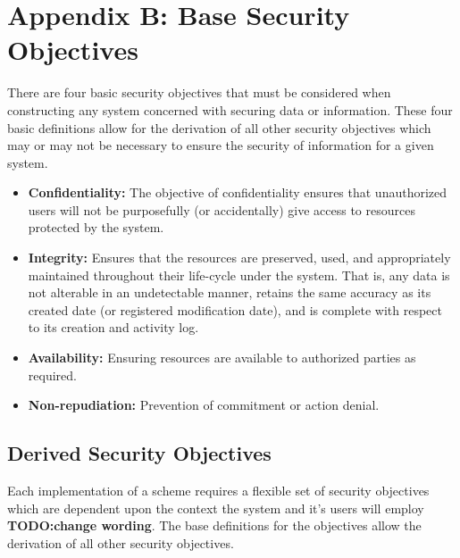 \section{Appendix B: Base Security Objectives}

There are four basic security objectives that must be considered when constructing any system concerned with securing data or information. These four basic definitions allow for the derivation of all other security objectives which may or may not be necessary to ensure the security of information for a given system.

\begin{itemize}
    \item \textbf{Confidentiality:} The objective of confidentiality ensures that unauthorized users will not be purposefully (or accidentally) give access to resources protected by the system. 
    \item \textbf{Integrity:} Ensures that the resources are preserved, used, and appropriately maintained throughout their life-cycle under the system. That is, any data is not alterable in an undetectable manner, retains the same
accuracy as its created date (or registered modification date), and is complete with respect to its creation and activity log. 
    \item \textbf{Availability:} Ensuring resources are available to authorized parties as required. 
    \item \textbf{Non-repudiation:} Prevention of commitment or action denial.
\end{itemize}

\subsection{Derived Security Objectives}

Each implementation of a scheme requires a flexible set of security objectives which are dependent upon the context the system and it's users will employ \textbf{TODO:change wording}. The base definitions for the objectives allow the derivation of all other security objectives.

